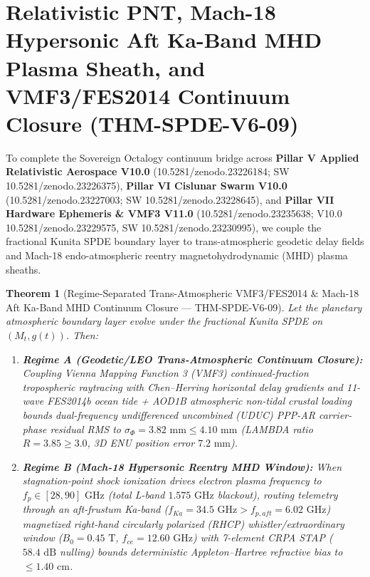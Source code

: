 \documentclass[11pt,a4paper,reqno]{article}
\def\bm#1{#1}%
\def\texttt#1{#1}%
\def\mathrm#1{#1}%
\def\mathcal#1{#1}%
\def\zenodo#1{10.5281/zenodo.#1}%
\newcommand{\zenodo}[1]{\href{https://doi.org/10.5281/zenodo.#1}{\texttt{10.5281/\allowbreak zenodo.#1}}}
\theoremstyle{plain}
\newtheorem{theorem}{Theorem}[section]
\theoremstyle{definition}
\theoremstyle{remark}
\numberwithin{equation}{section}
\begin{document}
\section{Relativistic PNT, Mach-18 Hypersonic Aft Ka-Band MHD Plasma Sheath, and VMF3/FES2014 Continuum Closure (\texttt{THM-SPDE-V6-09})}
\label{sec:spde_v6_hypersonic_mhd_vmf3}

To complete the Sovereign Octalogy continuum bridge across \textbf{Pillar V Applied Relativistic Aerospace V10.0} (\zenodo{23226184}; SW \zenodo{23226375}), \textbf{Pillar VI Cislunar Swarm V10.0} (\zenodo{23227003}; SW \zenodo{23228645}), and \textbf{Pillar VII Hardware Ephemeris \& VMF3 V11.0} (\zenodo{23235638}; V10.0 \zenodo{23229575}, SW \zenodo{23230995}), we couple the fractional Kunita SPDE boundary layer to trans-atmospheric geodetic delay fields and Mach-18 endo-atmospheric reentry magnetohydrodynamic (MHD) plasma sheaths.

\begin{theorem}[{Regime-Separated Trans-Atmospheric VMF3/FES2014 \& Mach-18 Aft Ka-Band MHD Continuum Closure --- \texttt{THM-SPDE-V6-09}}]\label{thm:spde_v6_pnt_mhd_closure}
Let the planetary atmospheric boundary layer evolve under the fractional Kunita SPDE on $(\mathcal{M}_t, g(t))$. Then:
\begin{enumerate}[label=\textbf{(\roman*)}, leftmargin=2.0em]
  \item \textbf{Regime A (Geodetic/LEO Trans-Atmospheric Continuum Closure):} Coupling Vienna Mapping Function 3 (VMF3) continued-fraction tropospheric raytracing with Chen--Herring horizontal delay gradients and 11-wave FES2014b ocean tide + AOD1B atmospheric non-tidal crustal loading bounds dual-frequency undifferenced uncombined (UDUC) PPP-AR carrier-phase residual RMS to $\sigma_\Phi = \bm{3.82\text{ mm}} \le 4.10\text{ mm}$ (LAMBDA ratio $R = \bm{3.85} \ge 3.0$, 3D ENU position error $\bm{7.2\text{ mm}}$).
  \item \textbf{Regime B (Mach-18 Hypersonic Reentry MHD Window):} When stagnation-point shock ionization drives electron plasma frequency to $f_p \in [28, 90]\text{ GHz}$ (total L-band $1.575\text{ GHz}$ blackout), routing telemetry through an aft-frustum Ka-band ($f_{\mathrm{Ka}} = 34.5\text{ GHz} > f_{p,\mathrm{aft}} = 6.02\text{ GHz}$) magnetized right-hand circularly polarized (RHCP) whistler/extraordinary window ($B_0 = 0.45\text{ T}$, $f_{ce} = 12.60\text{ GHz}$) with 7-element CRPA STAP ($58.4\text{ dB}$ nulling) bounds deterministic Appleton--Hartree refractive bias to $\le \bm{1.40\text{ cm}}$.
\end{enumerate}
\end{theorem}
\end{document}
